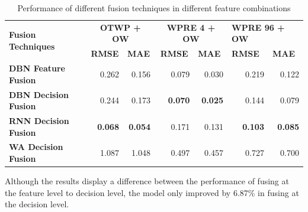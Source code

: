 \begin{table}[]
\begin{tabular}{|l|r|r|r|r|r|r|}
\hline
\multirow{2}{*}{\textbf{Fusion Techniques}} & \multicolumn{2}{c|}{\textbf{OTWP + OW}}                                & \multicolumn{2}{c|}{\textbf{WPRE 4 + OW}}                              & \multicolumn{2}{l|}{\textbf{WPRE 96 + OW}}                             \\ \cline{2-7} 
                                            & \multicolumn{1}{c|}{\textbf{RMSE}} & \multicolumn{1}{l|}{\textbf{MAE}} & \multicolumn{1}{c|}{\textbf{RMSE}} & \multicolumn{1}{l|}{\textbf{MAE}} & \multicolumn{1}{l|}{\textbf{RMSE}} & \multicolumn{1}{l|}{\textbf{MAE}} \\ \hline
\textbf{DBN Feature Fusion}                 & 0.262                              & 0.156                             & 0.079                              & 0.030                             & 0.219                              & 0.122                             \\ \hline
\textbf{DBN Decision Fusion}                & 0.244                              & 0.173                             & \textbf{0.070}                     & \textbf{0.025}                    & 0.144                              & 0.079                             \\ \hline
\textbf{RNN Decision Fusion}                & \textbf{0.068}                     & \textbf{0.054}                    & 0.171                              & 0.131                             & \textbf{0.103}                     & \textbf{0.085}                    \\ \hline
\textbf{WA Decision Fusion}                 & 1.087                              & 1.048                             & 0.497                              & 0.457                             & 0.727                              & 0.700                             \\ \hline
\end{tabular}
\caption{Performance of different fusion techniques in different feature combinations}
\label{table:fusion_results}
\end{table}

Although the results display a difference between the performance of fusing at the feature level to decision level, the model only improved by 6.87\% in fusing at the decision level. 

